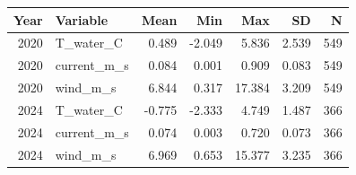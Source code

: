 \begin{tabular}{r l r r r r r}
\hline
Year & Variable & Mean & Min & Max & SD & N \\
\hline
2020 & T_water_C & 0.489 & -2.049 & 5.836 & 2.539 & 549 \\
2020 & current_m_s & 0.084 & 0.001 & 0.909 & 0.083 & 549 \\
2020 & wind_m_s & 6.844 & 0.317 & 17.384 & 3.209 & 549 \\
2024 & T_water_C & -0.775 & -2.333 & 4.749 & 1.487 & 366 \\
2024 & current_m_s & 0.074 & 0.003 & 0.720 & 0.073 & 366 \\
2024 & wind_m_s & 6.969 & 0.653 & 15.377 & 3.235 & 366 \\
\hline
\end{tabular}
